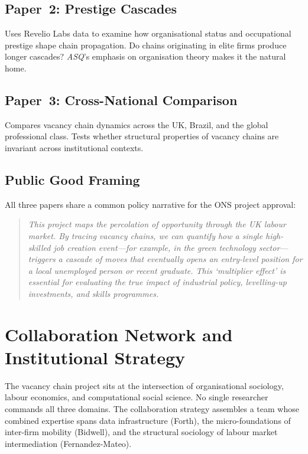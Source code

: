 \documentclass[a4paper]{tufte-handout}
\begin{document}
\subsection{Paper~2: Prestige Cascades}
Uses Revelio Labs data to examine how organisational status and occupational prestige shape chain propagation. Do chains originating in elite firms produce longer cascades? \emph{ASQ}'s emphasis on organisation theory makes it the natural home.

\subsection{Paper~3: Cross-National Comparison}
Compares vacancy chain dynamics across the UK, Brazil, and the global professional class. Tests whether structural properties of vacancy chains are invariant across institutional contexts.

\subsection{Public Good Framing}

All three papers share a common policy narrative for the ONS project approval:

\begin{quote}
\small\itshape
This project maps the percolation of opportunity through the UK labour market. By tracing vacancy chains, we can quantify how a single high-skilled job creation event---for example, in the green technology sector---triggers a cascade of moves that eventually opens an entry-level position for a local unemployed person or recent graduate. This `multiplier effect' is essential for evaluating the true impact of industrial policy, levelling-up investments, and skills programmes.
\end{quote}


\section{Collaboration Network and Institutional Strategy}

The vacancy chain project sits at the intersection of organisational sociology, labour economics, and computational social science. No single researcher commands all three domains. The collaboration strategy assembles a team whose combined expertise spans data infrastructure (Forth), the micro-foundations of inter-firm mobility (Bidwell), and the structural sociology of labour market intermediation (Fernandez-Mateo).
\end{document}
